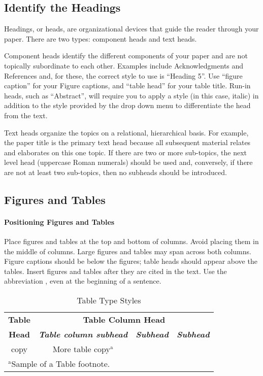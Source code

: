 \documentclass[conference]{IEEEtran}
\begin{document}
\subsection{Identify the Headings}
Headings, or heads, are organizational devices that guide the reader through 
your paper. There are two types: component heads and text heads.

Component heads identify the different components of your paper and are not 
topically subordinate to each other. Examples include Acknowledgments and 
References and, for these, the correct style to use is ``Heading 5''. Use 
``figure caption'' for your Figure captions, and ``table head'' for your 
table title. Run-in heads, such as ``Abstract'', will require you to apply a 
style (in this case, italic) in addition to the style provided by the drop 
down menu to differentiate the head from the text.

Text heads organize the topics on a relational, hierarchical basis. For 
example, the paper title is the primary text head because all subsequent 
material relates and elaborates on this one topic. If there are two or more 
sub-topics, the next level head (uppercase Roman numerals) should be used 
and, conversely, if there are not at least two sub-topics, then no subheads 
should be introduced.

\subsection{Figures and Tables}
\paragraph{Positioning Figures and Tables} Place figures and tables at the top and 
bottom of columns. Avoid placing them in the middle of columns. Large 
figures and tables may span across both columns. Figure captions should be 
below the figures; table heads should appear above the tables. Insert 
figures and tables after they are cited in the text. Use the abbreviation 
, even at the beginning of a sentence.

\begin{table}[htbp]
\caption{Table Type Styles}
\begin{center}
\begin{tabular}{|c|c|c|c|}
\hline
\textbf{Table}&\multicolumn{3}{|c|}{\textbf{Table Column Head}} \\
\cline{2-4} 
\textbf{Head} & \textbf{\textit{Table column subhead}}& \textbf{\textit{Subhead}}& \textbf{\textit{Subhead}} \\
\hline
copy& More table copy$^{\mathrm{a}}$& &  \\
\hline
\multicolumn{4}{l}{$^{\mathrm{a}}$Sample of a Table footnote.}
\end{tabular}
\label{tab1}
\end{center}
\end{table}
\end{document}
